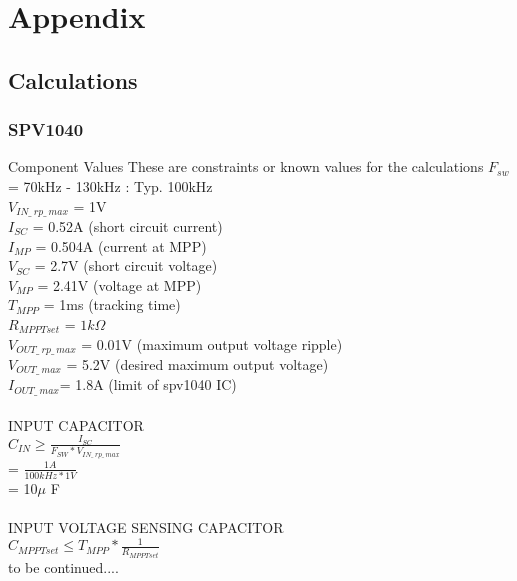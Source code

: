 \justifying
\chapter{Appendix}

\section{Calculations}

\subsection{SPV1040} 

Component Values
These are constraints or known values for the calculations
$F_{sw}$ = 70kHz - 130kHz : Typ. 100kHz \\
$V_{IN\_\: rp\_\: max}$ = 1V \\
$I_{SC}$ = 0.52A (short circuit current)\\
$I_{MP}$ = 0.504A (current at MPP)\\
$V_{SC}$ = 2.7V (short circuit voltage) \\
$V_{MP}$ = 2.41V (voltage at MPP)\\
$T_{MPP}$ = 1ms \: (tracking time) \\
$R_{MPPTset}$ = $1k\Omega$  \\
$V_{OUT\_\: rp\_\: max}$ = 0.01V (maximum output voltage ripple)\\
$V_{OUT\_\: max}$ = 5.2V (desired maximum output voltage)\\
$I_{OUT\_\: max} $= 1.8A (limit of spv1040 IC)\\ \\



INPUT CAPACITOR\\
$C_{IN} \geq \frac{I_{SC}}{F_{SW}*V_{IN\_\: rp\_\: max}}$\\
= $\frac{1A}{100kHz*1V}$\\
= 10$\mu$ F\\ \\
INPUT VOLTAGE SENSING CAPACITOR\\
$C_{MPPTset} \leq T_{MPP}*\frac{1}{R_{MPPTset}}$ \\

to be continued....

